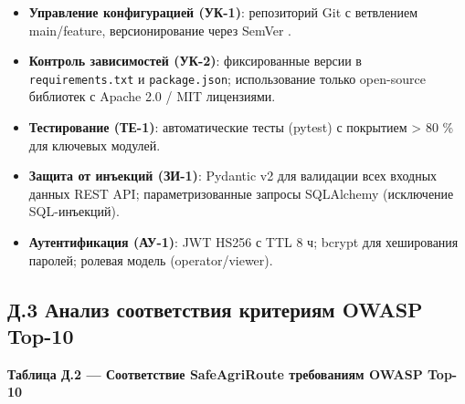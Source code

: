 \documentclass[14pt,a4paper]{extarticle}
\providecommand{\tightlist}{%
  \setlength{\itemsep}{0pt}\setlength{\parskip}{0pt}}
\begin{document}
\begin{itemize}
\tightlist
\item
  \textbf{Управление конфигурацией (УК-1)}: репозиторий Git с ветвлением main/feature, версионирование через SemVer .
\item
  \textbf{Контроль зависимостей (УК-2)}: фиксированные версии в \texttt{requirements.txt} и \texttt{package.json}; использование только open-source библиотек с Apache 2.0 / MIT лицензиями.
\item
  \textbf{Тестирование (ТЕ-1)}: автоматические тесты (pytest) с покрытием \textgreater{} 80 \% для ключевых модулей.
\item
  \textbf{Защита от инъекций (ЗИ-1)}: Pydantic v2 для валидации всех входных данных REST API; параметризованные запросы SQLAlchemy (исключение SQL-инъекций).
\item
  \textbf{Аутентификация (АУ-1)}: JWT HS256 с TTL 8 ч; bcrypt для хеширования паролей; ролевая модель (operator/viewer).
\end{itemize}

\hypertarget{ux434.3-ux430ux43dux430ux43bux438ux437-ux441ux43eux43eux442ux432ux435ux442ux441ux442ux432ux438ux44f-ux43aux440ux438ux442ux435ux440ux438ux44fux43c-owasp-top-10}{%
\subsection{Д.3 Анализ соответствия критериям OWASP Top-10}\label{ux434.3-ux430ux43dux430ux43bux438ux437-ux441ux43eux43eux442ux432ux435ux442ux441ux442ux432ux438ux44f-ux43aux440ux438ux442ux435ux440ux438ux44fux43c-owasp-top-10}}

\textbf{Таблица Д.2 --- Соответствие SafeAgriRoute требованиям OWASP Top-10}
\end{document}
